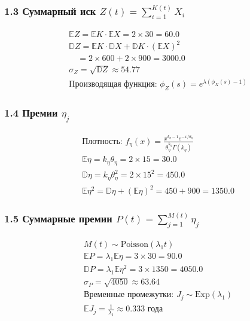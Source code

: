 \documentclass[12pt]{article}
\begin{document}
	\subsubsection*{1.3 Суммарный иск $Z(t) = \sum_{i=1}^{K(t)} X_i$}
	\begin{equation*}
		\begin{aligned}
			&\mathbb{E}Z = \mathbb{E}K \cdot \mathbb{E}X = 2 \times 30 = 60.0 \\
			&\mathbb{D}Z = \mathbb{E}K \cdot \mathbb{D}X + \mathbb{D}K \cdot (\mathbb{E}X)^2 \\
			&\quad = 2 \times 600 + 2 \times 900 = 3000.0 \\
			&\sigma_Z = \sqrt{\mathbb{D}Z} \approx 54.77 
			\\
			&\text{Производящая функция: } \phi_Z(s) = e^{\lambda(\phi_X(s)-1)}
		\end{aligned}
	\end{equation*}
	
	\subsubsection*{1.4 Премии $\eta_j$}
	\begin{equation*}
		\begin{aligned}
			&\text{Плотность: } f_\eta(x) = \frac{x^{k_\eta-1}e^{-x/\theta_\eta}}{\theta_\eta^{k_\eta}\Gamma(k_\eta)}\\
			&\mathbb{E}\eta = k_\eta\theta_\eta = 2 \times 15 = 30.0 \\
			&\mathbb{D}\eta = k_\eta\theta_\eta^2 = 2 \times 15^2 = 450.0 \\
			&\mathbb{E}\eta^2 = \mathbb{D}\eta + (\mathbb{E}\eta)^2 = 450 + 900 = 1350.0
		\end{aligned}
	\end{equation*}
	
	\subsubsection*{1.5 Суммарные премии $P(t) = \sum_{j=1}^{M(t)} \eta_j$}
	\begin{equation*}
		\begin{aligned}
			&M(t) \sim \text{Poisson}(\lambda_1 t) \\
			&\mathbb{E}P = \lambda_1\mathbb{E}\eta = 3 \times 30 = 90.0 \\
			&\mathbb{D}P = \lambda_1\mathbb{E}\eta^2 = 3 \times 1350 = 4050.0 \\
			&\sigma_P = \sqrt{4050} \approx 63.64 \\
			&\text{Временные промежутки: } J_j \sim \text{Exp}(\lambda_1) \\
			&\mathbb{E}J_j = \frac{1}{\lambda_1} \approx 0.333 \text{ года}
		\end{aligned}
	\end{equation*}
	
\end{document}
